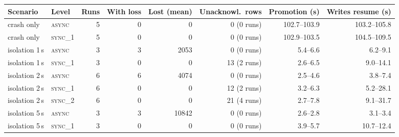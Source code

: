 \begin{tabular}{llrrrrrr}
\toprule
Scenario & Level & Runs & With loss & Lost (mean) & Unacknowl.\ rows & Promotion (s) & Writes resume (s) \\
\midrule
crash only & \textsc{async} & 5 & 0 & 0 & 0 (0 runs) & 102.7--103.9 & 103.2--105.8 \\
crash only & \textsc{sync\_1} & 5 & 0 & 0 & 0 (0 runs) & 102.9--103.5 & 104.5--109.5 \\
isolation 1\,s & \textsc{async} & 3 & 3 & 2053 & 0 (0 runs) & 5.4--6.6 & 6.2--9.1 \\
isolation 1\,s & \textsc{sync\_1} & 3 & 0 & 0 & 13 (2 runs) & 2.6--6.5 & 9.0--14.1 \\
isolation 2\,s & \textsc{async} & 6 & 6 & 4074 & 0 (0 runs) & 2.5--4.6 & 3.8--7.4 \\
isolation 2\,s & \textsc{sync\_1} & 6 & 0 & 0 & 12 (2 runs) & 3.2--6.3 & 5.2--28.1 \\
isolation 2\,s & \textsc{sync\_2} & 6 & 0 & 0 & 21 (4 runs) & 2.7--7.8 & 9.1--31.7 \\
isolation 5\,s & \textsc{async} & 3 & 3 & 10842 & 0 (0 runs) & 2.6--2.8 & 3.1--3.4 \\
isolation 5\,s & \textsc{sync\_1} & 3 & 0 & 0 & 0 (0 runs) & 3.9--5.7 & 10.7--12.4 \\
\bottomrule
\end{tabular}
